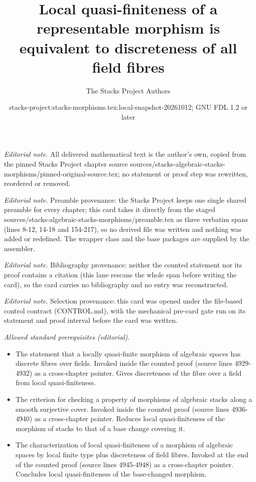 \documentclass[10pt,a4paper]{amsart}
\title{Local quasi-finiteness of a representable morphism is equivalent to discreteness of all field fibres}
\author{The Stacks Project Authors}
\date{stacks-project:stacks-morphisms.tex:local-snapshot-20261012; GNU FDL 1.2 or later}
\theoremstyle{plain}
\theoremstyle{definition}
\theoremstyle{remark}
\numberwithin{equation}{subsection}
\begin{document}
\maketitle
\noindent\textit{Editorial note.} All delivered mathematical text is the author's own, copied from the pinned Stacks Project chapter source sources/stacks-algebraic-stacks-morphisms/pinned-original-source.tex; no statement or proof step was rewritten, reordered or removed.\par\medskip
\noindent\textit{Editorial note.} Preamble provenance: the Stacks Project keeps one single shared preamble for every chapter; this card takes it directly from the staged sources/stacks-algebraic-stacks-morphisms/preamble.tex as three verbatim spans (lines 8-12, 14-18 and 154-217), so no derived file was written and nothing was added or redefined. The wrapper class and the base packages are supplied by the assembler.\par\medskip
\noindent\textit{Editorial note.} Bibliography provenance: neither the counted statement nor its proof contains a citation (this lane rescans the whole span before writing the card), so the card carries no bibliography and no entry was reconstructed.\par\medskip
\noindent\textit{Editorial note.} Selection provenance: this card was opened under the file-based control contract (CONTROL.md), with the mechanical pre-card gate run on its statement and proof interval before the card was written.\par\medskip
\noindent\textit{Allowed standard prerequisites (editorial).}\begin{itemize}
\item The statement that a locally quasi-finite morphism of algebraic spaces has discrete fibres over fields. Invoked inside the counted proof (source lines 4929-4932) as a cross-chapter pointer. Gives discreteness of the fibre over a field from local quasi-finiteness.
\item The criterion for checking a property of morphisms of algebraic stacks along a smooth surjective cover. Invoked inside the counted proof (source lines 4936-4940) as a cross-chapter pointer. Reduces local quasi-finiteness of the morphism of stacks to that of a base change covering it.
\item The characterization of local quasi-finiteness of a morphism of algebraic spaces by local finite type plus discreteness of field fibres. Invoked at the end of the counted proof (source lines 4945-4948) as a cross-chapter pointer. Concludes local quasi-finiteness of the base-changed morphism.
\end{itemize}\medskip
\end{document}
